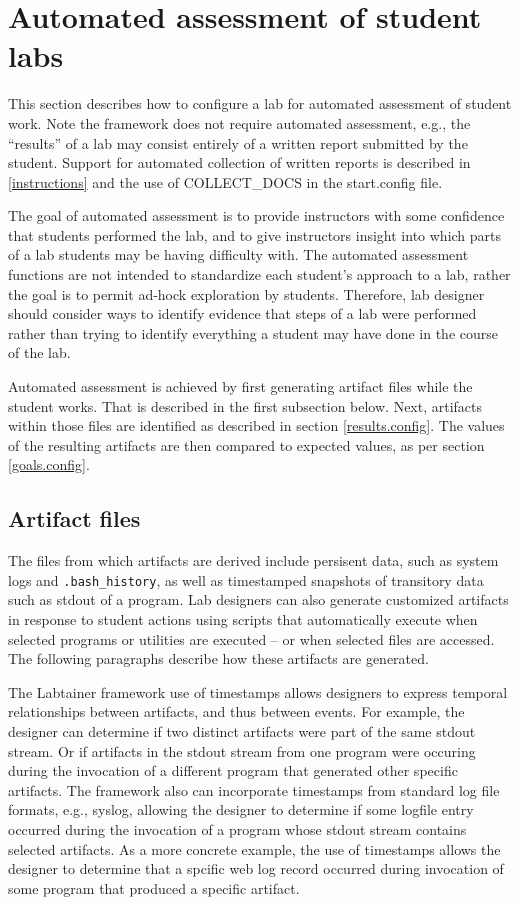 \documentclass[12pt]{article}
\begin{document}
\section{Automated assessment of student labs}
\label{assessment}
This section describes how to configure a lab for automated assessment of student work.
Note the framework does not require automated assessment, e.g., the
``results'' of a lab may consist entirely of a written report submitted by the student.
Support for automated collection of written reports is described in \ref{instructions}
and the use of COLLECT\_DOCS in the start.config file.

The goal of automated assessment is to provide instructors with some confidence that 
students performed the lab, and to give instructors insight into which parts
of a lab students may be having difficulty with.  The automated assessment functions are
not intended to standardize each student's approach to a lab, rather the goal is to permit
ad-hock exploration by students.  Therefore, lab designer should consider ways to identify
evidence that steps of a lab were performed rather than trying to identify everything a student
may have done in the course of the lab.

Automated assessment is achieved by first generating artifact files while the student works.  That
is described in the first subsection below.  Next, artifacts within those files are identified
as described in section \ref{results.config}.  The values of the resulting artifacts are then
compared to expected values, as per section \ref{goals.config}.

\subsection{Artifact files}
\label{artifact files}
The files from which artifacts are derived include persisent data, such as system logs and 
{\tt .bash\_history}, as well as 
timestamped snapshots of transitory data such as stdout of a program.  Lab designers can also generate
customized artifacts in response to student actions using scripts that automatically execute when selected
programs or utilities are executed -- or when selected files are accessed.   The following paragraphs
describe how these artifacts are generated.

The Labtainer framework use of timestamps allows designers to express temporal 
relationships between artifacts, and thus between events.  For example, the designer can determine if
two distinct artifacts were part of the same stdout stream.  Or if artifacts in the stdout stream from one 
program were occuring during the invocation of a different program that generated other specific artifacts.  
The framework also can incorporate
timestamps from standard log file formats, e.g., syslog, allowing the designer to determine if some logfile
entry occurred during the invocation of a program whose stdout stream contains selected artifacts.
As a more concrete example, the use of timestamps allows the designer to determine that a spcific web log
record occurred during invocation of some program that produced a specific artifact.
\end{document}
